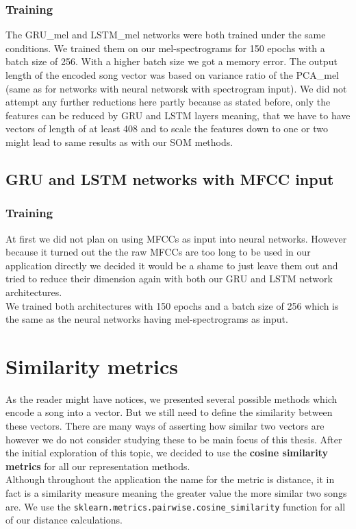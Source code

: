 \subsubsection{Training}
The GRU\_mel and LSTM\_mel networks were both trained under the same conditions. We trained them on our mel-spectrograms for 150 epochs with a batch size of 256. With a higher batch size we got a memory error. The output length of the encoded song vector was based on variance ratio of the PCA\_mel (same as for networks with neural networsk with spectrogram input). We did not attempt any further reductions here partly because as stated before, only the features can be reduced by GRU and LSTM layers meaning, that we have to have vectors of length of at least 408 and to scale the features down to one or two might lead to same results as with our SOM methods.

\subsection{GRU and LSTM networks with MFCC input}

\subsubsection{Training}
At first we did not plan on using MFCCs as input into neural networks. However because it turned out the the raw MFCCs are too long to be used in our application directly we decided it would be a shame to just leave them out and tried to reduce their dimension again with both our GRU and LSTM network architectures. \\ 
We trained both architectures with 150 epochs and a batch size of 256 which is the same as the neural networks having mel-spectrograms as input. 






\section{Similarity metrics}
As the reader might have notices, we presented several possible methods which encode a song into a vector. But we still need to define the similarity between these vectors. There are many ways of asserting how similar two vectors are however we do not consider studying these to be main focus of this thesis. After the initial exploration of this topic, we decided to use the \textbf{cosine similarity metrics} for all our representation methods. \\
Although throughout the application the name for the metric is distance, it in fact is a similarity measure meaning the greater value the more similar two songs are. We use the \texttt{sklearn.metrics.pairwise.cosine\_similarity} function for all of our distance calculations.

